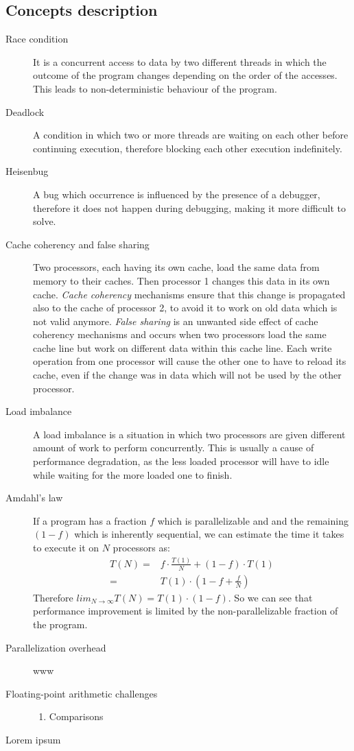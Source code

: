 \documentclass{article}
\begin{document}
\subsection{Concepts description}
\begin{description}
	\item[Race condition] It is a concurrent access to data by two different threads in which the outcome of the program changes depending on the order of the accesses. This leads to non-deterministic behaviour of the program.
	\item[Deadlock] A condition in which two or more threads are waiting on each other before continuing execution, therefore blocking each other execution indefinitely.
	\item[Heisenbug] A bug which occurrence is influenced by the presence of a debugger, therefore it does not happen during debugging, making it more difficult to solve.
	\item[Cache coherency and false sharing] Two processors, each having its own cache, load the same data from memory to their caches. Then processor 1 changes this data in its own cache. \emph{Cache coherency} mechanisms ensure that this change is propagated also to the cache of processor 2, to avoid it to work on old data which is not valid anymore. \emph{False sharing} is an unwanted side effect of cache coherency mechanisms and occurs when two processors load the same cache line but work on different data within this cache line. Each write operation from one processor will cause the other one to have to reload its cache, even if the change was in data which will not be used by the other processor.
	\item[Load imbalance] A load imbalance is a situation in which two processors are given different amount of work to perform concurrently. This is usually a cause of performance degradation, as the less loaded processor will have to idle while waiting for the more loaded one to finish.
	\item[Amdahl's law] If a program has a fraction $f$ which is parallelizable and and the remaining $(1-f)$ which is inherently sequential, we can estimate the time it takes to execute it on $N$ processors as:
	\begin{align}
		T(N) =& f \cdot \frac{T(1)}{N} + (1 - f) \cdot T(1)\\
		=& T(1) \cdot (1 - f + \frac{f}{N})
	\end{align}
	Therefore $lim_{N\to\infty} T(N) = T(1) \cdot (1 - f)$. So we can see that performance improvement is limited by the non-parallelizable fraction of the program.
	\item[Parallelization overhead] www
	\item[Floating-point arithmetic challenges]
		\begin{enumerate}[label=\Alph*]
			\item Comparisons
		\end{enumerate}
\end{description}
Lorem ipsum
\end{document}

